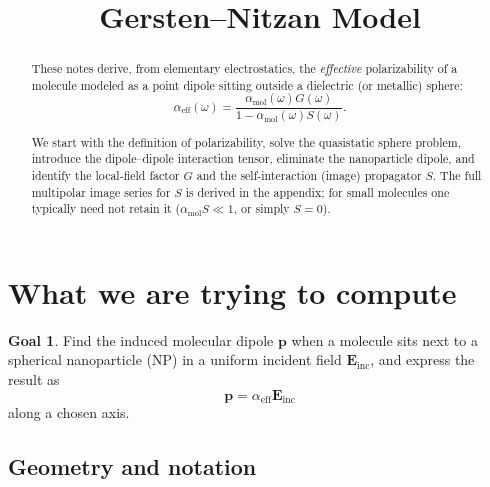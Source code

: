 \documentclass[11pt,a4paper]{article}
\title{Gersten--Nitzan Model}
\date{}
\theoremstyle{definition}
\newtheorem{goal}{Goal}[section]
\newcommand{\alpham}{\alpha_{\text{mol}}}
\newcommand{\alphaeff}{\alpha_{\mathrm{eff}}}
\newcommand{\Einc}{\mathbf{E}_{\mathrm{inc}}}
\newcommand{\p}{\mathbf{p}}
\begin{document}
\maketitle

\begin{abstract}
\noindent
These notes derive, from elementary electrostatics, the \emph{effective} polarizability of a molecule modeled as a point dipole sitting outside a dielectric (or metallic) sphere:
\[
  \alphaeff(\omega)
  =
  \frac{\alpham(\omega)G(\omega)}{1-\alpham(\omega)S(\omega)}.
\]

\noindent
We start with the definition of polarizability, solve the quasistatic sphere problem, introduce the dipole--dipole interaction tensor, eliminate the nanoparticle dipole, and identify the local-field factor $G$ and the self-interaction (image) propagator $S$. The full multipolar image series for $S$ is derived in the appendix; for small molecules one typically need not retain it ($\alpham S\ll 1$, or simply $S=0$).
\end{abstract}
\newpage
\tableofcontents
\newpage

\section{What we are trying to compute}

\begin{goal}
\noindent
Find the induced molecular dipole $\p$ when a molecule sits next to a spherical nanoparticle (NP) in a uniform incident field $\Einc$, and express the result as
\[
  \p = \alphaeff\Einc
\]
along a chosen axis.
\end{goal}

\subsection*{Geometry and notation}
\end{document}
